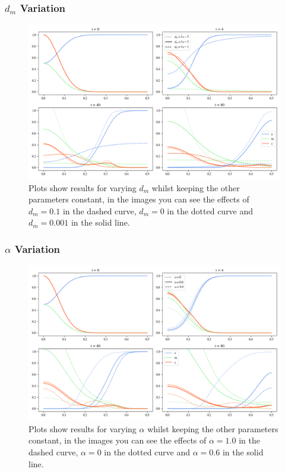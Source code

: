 \subsubsection*{$d_m$ Variation}
\begin{figure}[h]
    \centering
    \includegraphics[width=\textwidth]{resources/images/prolif_dm_variation.png}
    \caption{Plots show results for varying $d_m$ whilst keeping the other parameters constant, in the images you can see the effects of $d_m=0.1$ in the dashed curve, $d_m=0$ in the dotted curve and $d_m=0.001$ in the solid line.}
    \label{fig:dm_variation}
\end{figure}

\subsubsection*{$\alpha$ Variation}
\begin{figure}[h]
    \centering
    \includegraphics[width=\textwidth]{resources/images/prolif_alpha_variation.png}
    \caption{Plots show results for varying $\alpha$ whilst keeping the other parameters constant, in the images you can see the effects of $\alpha=1.0$ in the dashed curve, $\alpha=0$ in the dotted curve and $\alpha=0.6$ in the solid line.}
    \label{fig:alpha_variation}
\end{figure}

